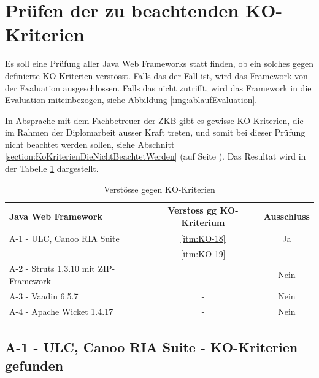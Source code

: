   \section{Prüfen der zu beachtenden KO-Kriterien}
  
  Es soll eine Prüfung aller Java Web Frameworks statt finden, ob ein solches
  gegen definierte KO-Kriterien verstösst. Falls das der Fall ist, wird das
  Framework von der Evaluation ausgeschlossen. Falls das nicht zutrifft, wird
  das Framework in die Evaluation miteinbezogen, siehe Abbildung
  \ref{img:ablaufEvaluation}.
  
  In Absprache mit dem Fachbetreuer der \ac{ZKB} gibt es gewisse KO-Kriterien,
  die im Rahmen der Diplomarbeit ausser Kraft treten, und somit bei dieser
  Prüfung nicht beachtet werden sollen, siehe Abschnitt
  \ref{section:KoKriterienDieNichtBeachtetWerden}
   (auf Seite
  \pageref{section:KoKriterienDieNichtBeachtetWerden}). Das Resultat wird in
  der Tabelle \ref{tab:gefundeneKOKriterien} dargestellt.
  \newline
  
  \begin{table}[!h]
    \sffamily 
    \begin{center}
      \begin{tabular}{lcc}
        \toprule
        \textbf{Java Web Framework} & \textbf{Verstoss gg KO-Kriterium} &
        \textbf{Ausschluss}\\
        \midrule
        A-1 - ULC, Canoo RIA Suite & \ref{itm:KO-18} & Ja\\
        & \ref{itm:KO-19} &\\
        A-2 - Struts 1.3.10 mit ZIP-Framework & - & Nein\\
        A-3 - Vaadin 6.5.7 & - & Nein\\
        A-4 - Apache Wicket 1.4.17 & - & Nein\\
        \bottomrule
      \end{tabular}
      \caption{Verstösse gegen KO-Kriterien}
      \label{tab:gefundeneKOKriterien}
    \end{center}
  \end{table}

  \subsection{A-1 - ULC, Canoo RIA Suite - KO-Kriterien gefunden}
  
